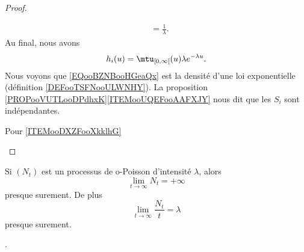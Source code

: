 \begin{proof}
\begin{subproof}
\begin{subequations}
\begin{align}
				                                                                       & =\frac{1}{ \lambda }.
			\end{align}
		\end{subequations}
		Au final, nous avons
		\begin{equation}        \label{EQooBZNBooHGeaQx}
			h_i(u)=\mtu_{\mathopen[ 0 , \infty \mathclose[}(u)\lambda  e^{-\lambda u}.
		\end{equation}
		\spitem[Conclusions]
		Nous voyons que \eqref{EQooBZNBooHGeaQx} est la densité d'une loi exponentielle (définition \ref{DEFooTSFNooULWNHY}). La proposition \ref{PROPooVUTLooDPdhxK}\ref{ITEMooUQEFooAAFXJY} nous dit que les \( S_i\) sont indépendantes.
	\end{subproof}


	\begin{center}
		Pour \ref{ITEMooDXZFooXkklhG}
	\end{center}

\end{proof}


\begin{proposition}
	Si \( (N_t)\) est un processus de o-Poisson d'intensité \( \lambda\), alors
	\begin{equation}
		\lim_{t\to \infty} N_t=+\infty
	\end{equation}
	presque surement. De plus
	\begin{equation}        \label{EqvaVYAs}
		\lim_{t\to \infty} \frac{ N_t }{ t }=\lambda
	\end{equation}
	presque surement.
\end{proposition}
.

